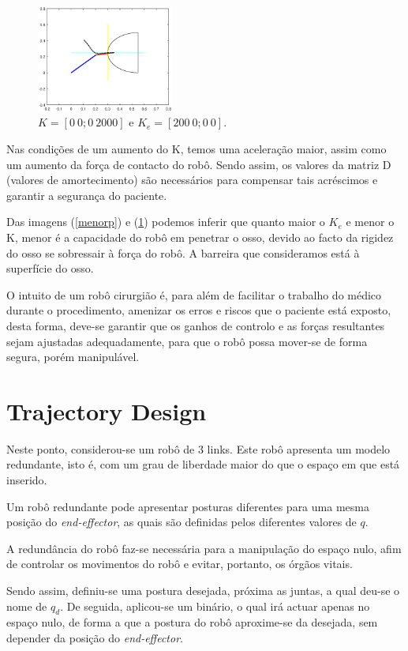 \documentclass[a4paper,twocolumn,final,11pt]{article}
\let\oldref\ref
\renewcommand{\ref}[1]{(\oldref{#1})}
\begin{document}
\begin{figure}[H]
	\centering
	\includegraphics[width=0.4\textwidth]{9_ke200_kp2000_fm.eps}
	\caption{$K = \left[0~0 ;0~2000 \right]$ e $K_e = \left[200~0 ;0~0 \right] $.}
  \label{maiorp}
\end{figure}


Nas condições de um aumento do K, temos uma aceleração maior, assim como um aumento da força de contacto do robô. Sendo assim, os valores da matriz D (valores de amortecimento) são necessários para compensar tais acréscimos e garantir a segurança do paciente.

Das imagens \ref{menorp} e \ref{maiorp} podemos inferir que quanto maior o $K_e$ e menor o K, menor é a capacidade do robô em penetrar o osso, devido ao facto da rigidez do osso se sobressair à força do robô. A barreira que consideramos está à superfície do osso. 

O intuito de um robô cirurgião é, para além de facilitar o trabalho do médico durante o procedimento, amenizar os erros e riscos que o paciente está exposto, desta forma, deve-se garantir que os ganhos de controlo e as forças resultantes sejam ajustadas adequadamente, para que o robô possa mover-se de forma segura, porém manipulável.
 

\section{Trajectory Design}
 
 Neste ponto, considerou-se um robô de 3 links. Este robô apresenta um modelo  redundante, isto é, com um  grau de liberdade maior do que o espaço em que está inserido.

 Um robô redundante pode apresentar posturas diferentes para uma mesma posição do \textit{end-effector}, as quais são definidas pelos diferentes valores de $q$.
 
 A redundância do robô faz-se necessária para a manipulação do espaço nulo, afim de controlar os movimentos do robô e evitar, portanto, os órgãos vitais.
 
 Sendo assim, definiu-se uma postura desejada, próxima as juntas, a qual deu-se o nome de $q_d$. De seguida, aplicou-se um binário, o qual irá actuar apenas no espaço nulo, de forma a que a postura do robô aproxime-se da desejada, sem depender da posição do \textit{end-effector}.
\end{document}
